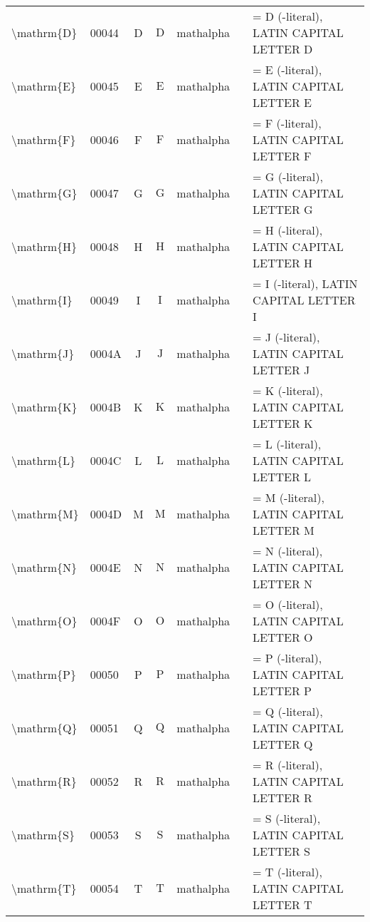 \documentclass[a4paper,landscape]{article}
\begin{document}
\begin{longtable}{llcclll}
\textbackslash{}mathrm\{D\} & 00044 & D & $\mathrm{D}$ & mathalpha &  & = D (-literal),  LATIN CAPITAL LETTER D \\
\textbackslash{}mathrm\{E\} & 00045 & E & $\mathrm{E}$ & mathalpha &  & = E (-literal),  LATIN CAPITAL LETTER E \\
\textbackslash{}mathrm\{F\} & 00046 & F & $\mathrm{F}$ & mathalpha &  & = F (-literal),  LATIN CAPITAL LETTER F \\
\textbackslash{}mathrm\{G\} & 00047 & G & $\mathrm{G}$ & mathalpha &  & = G (-literal),  LATIN CAPITAL LETTER G \\
\textbackslash{}mathrm\{H\} & 00048 & H & $\mathrm{H}$ & mathalpha &  & = H (-literal),  LATIN CAPITAL LETTER H \\
\textbackslash{}mathrm\{I\} & 00049 & I & $\mathrm{I}$ & mathalpha &  & = I (-literal),  LATIN CAPITAL LETTER I \\
\textbackslash{}mathrm\{J\} & 0004A & J & $\mathrm{J}$ & mathalpha &  & = J (-literal),  LATIN CAPITAL LETTER J \\
\textbackslash{}mathrm\{K\} & 0004B & K & $\mathrm{K}$ & mathalpha &  & = K (-literal),  LATIN CAPITAL LETTER K \\
\textbackslash{}mathrm\{L\} & 0004C & L & $\mathrm{L}$ & mathalpha &  & = L (-literal),  LATIN CAPITAL LETTER L \\
\textbackslash{}mathrm\{M\} & 0004D & M & $\mathrm{M}$ & mathalpha &  & = M (-literal),  LATIN CAPITAL LETTER M \\
\textbackslash{}mathrm\{N\} & 0004E & N & $\mathrm{N}$ & mathalpha &  & = N (-literal),  LATIN CAPITAL LETTER N \\
\textbackslash{}mathrm\{O\} & 0004F & O & $\mathrm{O}$ & mathalpha &  & = O (-literal),  LATIN CAPITAL LETTER O \\
\textbackslash{}mathrm\{P\} & 00050 & P & $\mathrm{P}$ & mathalpha &  & = P (-literal),  LATIN CAPITAL LETTER P \\
\textbackslash{}mathrm\{Q\} & 00051 & Q & $\mathrm{Q}$ & mathalpha &  & = Q (-literal),  LATIN CAPITAL LETTER Q \\
\textbackslash{}mathrm\{R\} & 00052 & R & $\mathrm{R}$ & mathalpha &  & = R (-literal),  LATIN CAPITAL LETTER R \\
\textbackslash{}mathrm\{S\} & 00053 & S & $\mathrm{S}$ & mathalpha &  & = S (-literal),  LATIN CAPITAL LETTER S \\
\textbackslash{}mathrm\{T\} & 00054 & T & $\mathrm{T}$ & mathalpha &  & = T (-literal),  LATIN CAPITAL LETTER T \\

\end{longtable}
\end{document}
